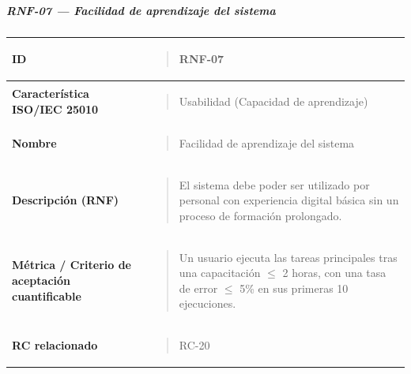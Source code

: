 \documentclass[
]{article}
\newcounter{none} %
\begin{document}
\subparagraph{RNF-07 --- Facilidad de aprendizaje del
sistema}\label{rnf-07-facilidad-de-aprendizaje-del-sistema}

{\def\LTcaptype{none} %
\begin{longtable}[]{@{}
  >{\raggedright\arraybackslash}p{}
  >{\raggedright\arraybackslash}p{}@{}}
\toprule\noalign{}
\begin{minipage}[b]{\linewidth}\raggedright
\textbf{ID}
\end{minipage} & \begin{minipage}[b]{\linewidth}\raggedright
\begin{quote}
RNF-07
\end{quote}
\end{minipage} \\
\midrule\noalign{}
\endhead
\bottomrule\noalign{}
\endlastfoot
\textbf{Característica ISO/IEC 25010} & \begin{minipage}[t]{\linewidth}\raggedright
\begin{quote}
Usabilidad (Capacidad de aprendizaje)
\end{quote}
\end{minipage} \\
\textbf{Nombre} & \begin{minipage}[t]{\linewidth}\raggedright
\begin{quote}
Facilidad de aprendizaje del sistema
\end{quote}
\end{minipage} \\
\textbf{Descripción (RNF)} & \begin{minipage}[t]{\linewidth}\raggedright
\begin{quote}
El sistema debe poder ser utilizado por personal con experiencia
digital básica sin un proceso de formación prolongado.
\end{quote}
\end{minipage} \\
\textbf{Métrica / Criterio de aceptación cuantificable} & \begin{minipage}[t]{\linewidth}\raggedright
\begin{quote}
Un usuario ejecuta las tareas principales tras una capacitación
\(\leq\) 2 horas, con una tasa de error \(\leq\) 5\% en sus primeras 10
ejecuciones.
\end{quote}
\end{minipage} \\
\textbf{RC relacionado} & \begin{minipage}[t]{\linewidth}\raggedright
\begin{quote}
RC-20
\end{quote}
\end{minipage} \\
\end{longtable}
}
\end{document}
